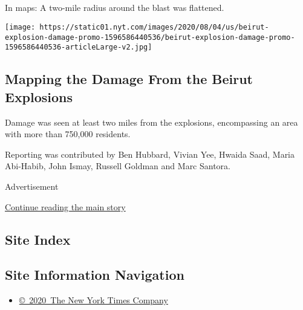 \hypertarget{-4}{%
\subsection{}\label{-4}}

In maps: A two-mile radius around the blast was flattened.

\href{https://www.nytimes.com/interactive/2020/08/04/world/middleeast/beirut-explosion-damage.html}{}

\texttt{[image: https://static01.nyt.com/images/2020/08/04/us/beirut-explosion-damage-promo-1596586440536/beirut-explosion-damage-promo-1596586440536-articleLarge-v2.jpg]}

\hypertarget{mapping-the-damage-from-the-beirut-explosions}{%
\subsection{Mapping the Damage From the Beirut
Explosions}\label{mapping-the-damage-from-the-beirut-explosions}}

Damage was seen at least two miles from the explosions, encompassing an
area with more than 750,000 residents.

Reporting was contributed by Ben Hubbard, Vivian Yee, Hwaida Saad, Maria
Abi-Habib, John Ismay, Russell Goldman and Marc Santora.

Advertisement

\protect\hyperlink{after-bottom}{Continue reading the main story}

\hypertarget{site-index}{%
\subsection{Site Index}\label{site-index}}

\hypertarget{site-information-navigation}{%
\subsection{Site Information
Navigation}\label{site-information-navigation}}

\begin{itemize}
\tightlist
\item
  \href{https://help.nytimes.com/hc/en-us/articles/115014792127-Copyright-notice}{©~2020~The
  New York Times Company}
\end{itemize}

